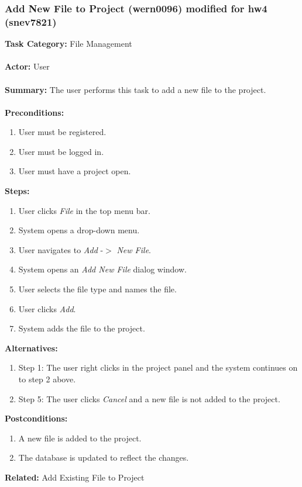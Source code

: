 \documentclass[11pt]{report}
\begin{document}
\newpage




\subsubsection{Add New File to Project (wern0096) modified for hw4 (snev7821)}
\begin{framed}

	\textbf{Task Category:} File Management \\ \\
	\textbf{Actor:} User \\ \\
	\textbf{Summary:} The user performs this task to add a new file to the project. \\ \\
	\textbf{Preconditions:} 
	\begin{enumerate}
		\item User must be registered.
		\item User must be logged in.
		\item User must have a project open.
	\end{enumerate}
	\textbf{Steps:}
	\begin{enumerate}
		\item User clicks \textit{File} in the top menu bar.
		\item System opens a drop-down menu.
		\item User navigates to \textit{Add} -$>$ \textit{New File}.
		\item System opens an \textit{Add New File} dialog window.
		\item User selects the file type and names the file.
		\item User clicks \textit{Add}.
		\item System adds the file to the project.
	\end{enumerate}
	\textbf{Alternatives:} 
	\begin{enumerate}
		\item Step 1: The user right clicks in the project panel and the system continues on to step 2 above.
		\item Step 5: The user clicks \textit{Cancel} and a new file is not added to the project.
	\end{enumerate}
	\textbf{Postconditions:}
	\begin{enumerate}
		\item A new file is added to the project.
		\item The database is updated to reflect the changes.
	\end{enumerate}
	\textbf{Related:} Add Existing File to Project
\end{framed} 
\end{document}
